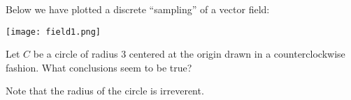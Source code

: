 \documentclass{ximera}
\begin{document}
\begin{exercise}
  Below we have plotted a discrete ``sampling'' of a vector field:
  \begin{image}
    \texttt{[image: field1.png]}
  \end{image}
  Let $C$ be a circle of radius $3$ centered at the origin drawn in a
  counterclockwise fashion.  What conclusions seem to be true?
  \begin{selectAll}
  \end{selectAll}
  \begin{hint}
    Note that the radius of the circle is irreverent. 
  \end{hint}
\end{exercise}
\end{document}
